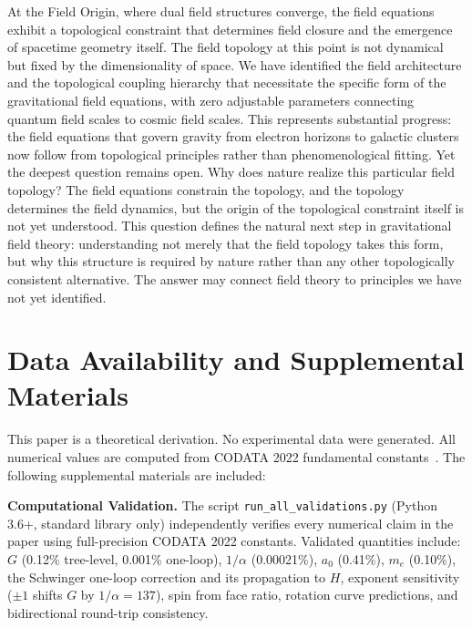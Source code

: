 \documentclass[aps,prd,preprint,superscriptaddress,showpacs,preprintnumbers,amsmath,amssymb,nofootinbib]{revtex4-2}
\begin{document}
At the Field Origin, where dual field structures converge, the field equations exhibit a topological constraint that determines field closure and the emergence of spacetime geometry itself. The field topology at this point is not dynamical but fixed by the dimensionality of space. We have identified the field architecture and the topological coupling hierarchy that necessitate the specific form of the gravitational field equations, with zero adjustable parameters connecting quantum field scales to cosmic field scales. This represents substantial progress: the field equations that govern gravity from electron horizons to galactic clusters now follow from topological principles rather than phenomenological fitting. Yet the deepest question remains open. Why does nature realize this particular field topology? The field equations constrain the topology, and the topology determines the field dynamics, but the origin of the topological constraint itself is not yet understood. This question defines the natural next step in gravitational field theory: understanding not merely that the field topology takes this form, but why this structure is required by nature rather than any other topologically consistent alternative. The answer may connect field theory to principles we have not yet identified.

\section*{Data Availability and Supplemental Materials}

This paper is a theoretical derivation. No experimental data were generated. All numerical values are computed from CODATA 2022 fundamental constants~\cite{codata2022}. The following supplemental materials are included:

\textbf{Computational Validation.}\quad
The script \texttt{run\_all\_validations.py} (Python 3.6+, standard library only) independently verifies every numerical claim in the paper using full-precision CODATA 2022 constants. Validated quantities include: $G$ (0.12\% tree-level, 0.001\% one-loop), $1/\alpha$ (0.00021\%), $a_0$ (0.41\%), $m_e$ (0.10\%), the Schwinger one-loop correction and its propagation to $H$, exponent sensitivity ($\pm 1$ shifts $G$ by $1/\alpha = 137$), spin from face ratio, rotation curve predictions, and bidirectional round-trip consistency.
\end{document}
